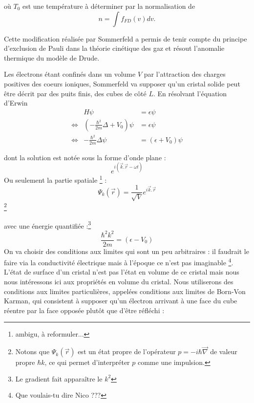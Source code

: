 où $T_0$ est une température à déterminer par la normalisation de
\begin{equation}
n = \int f_{FD}(v)dv .
\end{equation}

Cette modification réalisée par Sommerfeld a permis de tenir compte
du principe d'exclusion de Pauli dans la théorie cinétique des gaz
et résout l'anomalie thermique du modèle de Drude.


Les électrons étant confinés dans un volume $V$ par l'attraction 
des charges positives des coeurs ioniques, Sommerfeld va supposer
qu'un cristal solide peut être décrit par des puits finis, des cubes
de côté $L$.  En résolvant l'équation d'Erwin  
\begin{equation}
	\begin{array}{lll}
		                & H\psi                                            & =  \epsilon\psi      \\
		\Leftrightarrow & \left(-\frac{\hbar^2}{2m}\Delta + V_0\right)\psi & = \epsilon\psi       \\
		\Leftrightarrow & -\frac{\hbar^2}{2m}\Delta \psi                   & = (\epsilon+V_0)\psi 
	\end{array}
\end{equation}


dont la solution est notée sous la forme d'onde plane :
\begin{equation}
	e^{i(\vec k . \vec{r}-\omega t)}
\end{equation}
Ou seulement la partie spatiale \footnote{ambigu, à reformuler...} :
\begin{equation}
	\Psi_k(\vec r) = \frac{1}{\sqrt{V}} e^{i\vec k . \vec{r}}
\end{equation}
\footnote{Notons que $\Psi_k(\vec r)$ est un état propre de l'opérateur
 $p = -i\hbar \vec{\nabla}$ de valeur propre $\hbar k$, ce qui permet 
 d'interpréter $p$ comme une impulsion.}

avec une énergie quantifiée :\footnote{
Le gradient fait apparaître le $k^2$}
\begin{equation}
	\frac{\hbar^2k^2}{2m} = (\epsilon-V_0)
\end{equation}
On va choisir des conditions aux limites qui sont un peu arbitraires :
il faudrait le faire via la conductivité électrique mais à l'époque ce 
n'est pas imaginable \footnote{Que voulais-tu dire Nico ???}. L'état de surface d'un cristal n'est pas 
l'état en volume de ce cristal mais nous nous intéressons ici aux propriétés
en volume du cristal. Nous utiliserons des conditions aux limites particulières,
appelées conditions aux limites de Born-Von Karman, qui consistent à 
supposer qu'un électron arrivant à une face du cube réentre par la face
opposée plutôt que d'être réfléchi : \\


